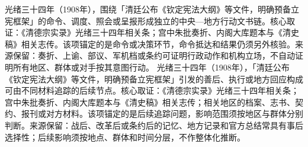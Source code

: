 光绪三十四年（1908年），围绕「清廷公布《钦定宪法大纲》等文件，明确预备立宪框架」的命令、调度、照会或呈报形成独立的中央—地方行动文书链。核心取证：《清德宗实录》光绪三十四年相关条；宫中朱批奏折、内阁大库题本与《清史稿》相关志传。该项锚定的是命令或决策环节，命令抵达和结果仍须另外核验。来源保留：奏折、上谕、部议、军机档或条约可证明行政动作和机构立场，不自动证明所有地区、群体或对手按其意图行动。
光绪三十四年（1908年），「清廷公布《钦定宪法大纲》等文件，明确预备立宪框架」引发的善后、执行或地方回应构成可由不同材料追踪的后续节点。核心取证：《清德宗实录》光绪三十四年相关条；宫中朱批奏折、内阁大库题本与《清史稿》相关志传；相关地区的档案、志书、契约、报刊或对方材料。该项锚定的是后续追踪问题，影响范围须按地区与群体分别判断。来源保留：战后、改革后或条约后的记忆、地方记录和官方总结常具有事后选择性；后续影响须按地点、群体和时间分层，不作整体化推断。
